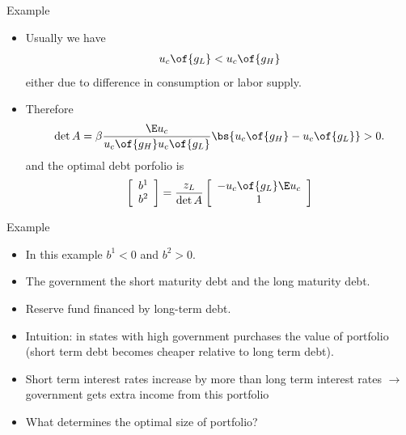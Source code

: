 \documentclass[11pt,xcolor={dvipsnames},aspectratio=159,hyperref={pdftex,pdfpagemode=UseNone,hidelinks,pdfdisplaydoctitle=true},usepdftitle=false]{beamer}
\begin{document}
\begin{frame}{Example}
    \begin{itemize}
        \item Usually we have 
        \begin{align*}
            u_c \of{g_L} < u_c \of{g_H}
        \end{align*}
        either due to difference in consumption or labor supply. 
        \item Therefore 
        \begin{align*}
            \det{A} = \beta \frac{\E u_c}{u_c\of{g_H} u_c\of{g_L}} \bs{u_c\of{g_H}-u_c\of{g_L}} > 0.
        \end{align*}
        and the optimal debt porfolio is 
        \begin{align*} 
            \left[\begin{array}{c}
                b^1\\
                b^2\\
                \end{array}\right]                  =
                \frac{z_L}{\det{A}}
                \left[\begin{array}{c}
                -u_c \of{g_L} \E u_c\\
                1\\
                \end{array}\right] 
        \end{align*}
     \end{itemize}
\end{frame}

\begin{frame}{Example}
    \begin{itemize}
        \item In this example $b^1 < 0$ and $b^2 > 0$. 
        \item The government  the short maturity debt and  the long maturity debt.
        \item Reserve fund financed by long-term debt.
        \item Intuition: in states with high government purchases the value of portfolio  (short term debt becomes cheaper relative to long term debt).
        \item Short term interest rates increase by more than long term interest rates $\rightarrow$ government gets extra income from this portfolio 
        \item What determines the optimal size of portfolio? 
    \end{itemize}
\end{frame}
\end{document}
